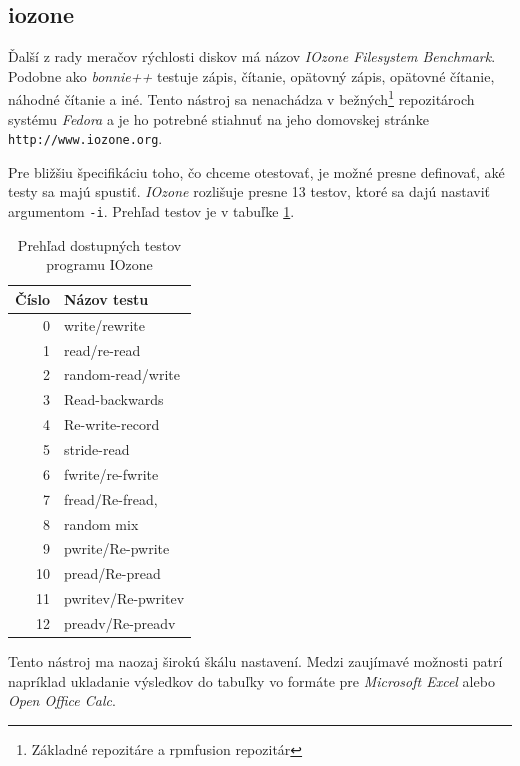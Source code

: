 %
%

\subsection{iozone}

Ďalší z rady meračov rýchlosti diskov má názov \emph{IOzone Filesystem
Benchmark}. Podobne ako \emph{bonnie++} testuje zápis, čítanie, opätovný zápis,
opätovné čítanie, náhodné čítanie a iné. Tento nástroj sa nenachádza v
bežných\footnote{Základné repozitáre a rpmfusion repozitár} repozitároch
systému \emph{Fedora} a je ho potrebné stiahnuť na jeho domovskej stránke
\texttt{http://www.iozone.org}.

Pre bližšiu špecifikáciu toho, čo chceme otestovať, je možné presne definovať,
aké testy sa majú spustiť. \emph{IOzone} rozlišuje presne 13 testov, ktoré sa
dajú nastaviť argumentom \texttt{-i}. Prehľad testov je v tabuľke
\ref{tab:iozone-tests}.

\begin{table}[H]
\begin{center}
\begin{tabular}{|r|l|}
    \hline
    \textbf{Číslo} & \textbf{Názov testu} \\
    \hline
    0 & write/rewrite \\
    1 & read/re-read \\
    2 & random-read/write \\
    3 & Read-backwards \\
    4 & Re-write-record \\
    5 & stride-read \\
    6 & fwrite/re-fwrite \\
    7 & fread/Re-fread, \\
    8 & random mix \\
    9 & pwrite/Re-pwrite \\
    10 & pread/Re-pread \\
    11 & pwritev/Re-pwritev \\
    12 & preadv/Re-preadv \\
    \hline
\end{tabular}
\caption{Prehľad dostupných testov programu IOzone}
\label{tab:iozone-tests}
\end{center}
\end{table}

Tento nástroj ma naozaj širokú škálu nastavení. Medzi zaujímavé možnosti patrí napríklad ukladanie výsledkov do tabuľky vo formáte pre \emph{Microsoft Excel} alebo \emph{Open Office Calc}.

